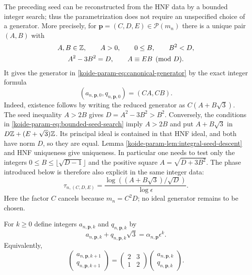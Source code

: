 The preceding seed can be reconstructed from the HNF data by a bounded
integer search; thus the parametrization does not require an unspecified
choice of a generator.  More precisely, for
$\mathbf p=(C,D,E)\in\mathcal P(m_n)$ there is a unique pair $(A,B)$ with
\begin{equation}
 \begin{gathered}
  A,B\in\mathbb Z,\qquad A>0,\qquad 0\leq B,\qquad B^2<D,\\
  A^2-3B^2=D,\qquad A\equiv EB\pmod D.
 \end{gathered}
 \label{koide-param-eq:bounded-seed-search}
\end{equation}
It gives the generator in \eqref{koide-param-eq:canonical-generator} by the exact
integer formula
\begin{equation}
 (a_{n,\mathbf p,0},q_{n,\mathbf p,0})=(CA,CB).
 \label{koide-param-eq:HNF-to-seed}
\end{equation}
Indeed, existence follows by writing the reduced generator as
$C(A+B\sqrt3)$.  The seed inequality $A>2B$ gives
$D=A^2-3B^2>B^2$.  Conversely, the conditions in
\eqref{koide-param-eq:bounded-seed-search} imply $A>2B$ and put
$A+B\sqrt3$ in $D\mathbb Z+(E+\sqrt3)\mathbb Z$.  Its principal ideal is contained
in that HNF ideal, and both have norm $D$, so they are equal.  Lemma
\ref{koide-param-lem:integral-seed-descent} and HNF uniqueness give uniqueness.  In
particular one needs to test only the integers
$0\leq B\leq\lfloor\sqrt{D-1}\rfloor$ and the positive square
$A=\sqrt{D+3B^2}$.
The phase introduced below is therefore also explicit in the same integer
data:
\begin{equation}
 \tau_{n,(C,D,E)}
 =\frac{\log((A+B\sqrt3)/\sqrt D)}{\log\epsilon}.
 \label{koide-param-eq:HNF-phase-explicit}
\end{equation}
Here the factor $C$ cancels because $m_n=C^2D$; no ideal generator remains
to be chosen.

For $k\geq0$ define integers $a_{n,\mathbf p,k}$ and
$q_{n,\mathbf p,k}$ by
\begin{equation}
 a_{n,\mathbf p,k}+q_{n,\mathbf p,k}\sqrt3
 =\alpha_{n,\mathbf p}\epsilon^k.
 \label{koide-param-eq:unit-orbit-coordinates}
\end{equation}
Equivalently,
\begin{equation}
 \begin{pmatrix}a_{n,\mathbf p,k+1}\\q_{n,\mathbf p,k+1}\end{pmatrix}
 =
 \begin{pmatrix}2&3\\1&2\end{pmatrix}
 \begin{pmatrix}a_{n,\mathbf p,k}\\q_{n,\mathbf p,k}\end{pmatrix}.
 \label{koide-param-eq:unit-recurrence}
\end{equation}

